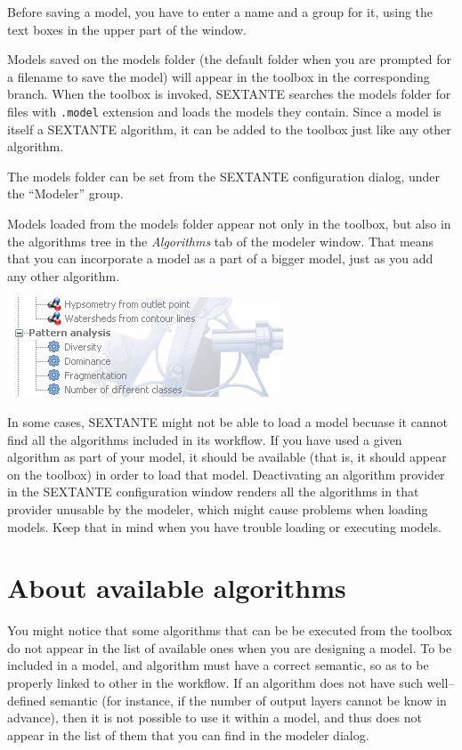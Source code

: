 Before saving a model, you have to enter a name and a group for it, using the text boxes in the upper part of the window.

Models saved on the models folder (the default folder when you are prompted for a filename to save the model) will appear in the toolbox in the corresponding branch. When the toolbox is invoked, SEXTANTE searches the models folder for files with \texttt{.model} extension and loads the models they contain. Since a model is itself a SEXTANTE algorithm, it can be added to the toolbox just like any other algorithm.

The models folder can be set from the SEXTANTE configuration dialog, under the ``Modeler'' group.

Models loaded from the models folder appear not only in the toolbox, but also in the algorithms tree in the \emph{Algorithms} tab of the modeler window. That means that you can incorporate a model as a part of a bigger model, just as you add any other algorithm. 

\begin{center}
\includegraphics[width=.5\columnwidth]{models_icon.png}
\end{center}

In some cases, SEXTANTE might not be able to load a model becuase it cannot find all the algorithms included in its workflow. If you have used a given algorithm as part of your model, it should be available (that is, it should appear on the toolbox) in order to load that model. Deactivating an algorithm provider in the SEXTANTE configuration window renders all the algorithms in that provider unusable by the modeler, which might cause problems when loading models. Keep that in mind when you have trouble loading or executing models.

\section{About available algorithms}
	
You might notice that some algorithms that can be be executed from the toolbox do not appear in the list of available ones when you are designing a model. To be included in a model, and algorithm must have a correct semantic, so as to be properly linked to other in the workflow. If an algorithm does not have such well--defined semantic (for instance, if the number of output layers cannot be know in advance), then it is not possible to use it within a model, and thus does not appear in the list of them that you can find in the modeler dialog.

